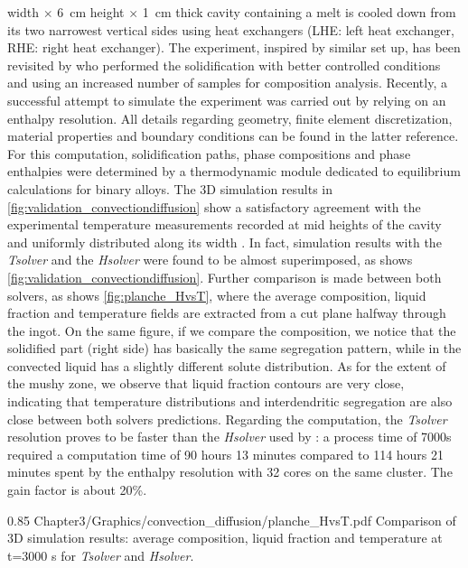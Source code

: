width $\times$ \SI{6}{\centi \metre} height $\times$ \SI{1}{\centi \metre} thick cavity containing 
a  melt is cooled down from its two 
narrowest vertical sides using heat exchangers (LHE: left heat exchanger, RHE: right heat exchanger). The 
experiment, inspired by \citet{hebditch_observations_1974} similar set up, has been 
revisited by \citet{hachani_experimental_2012} who performed the solidification with better 
controlled conditions and using an increased number of samples for composition analysis. Recently, a successful 
attempt to simulate the experiment was carried out by \citet{carozzani_direct_2013} relying on an enthalpy resolution. 
All details regarding geometry, finite element discretization, material properties 
and boundary conditions can be found in the latter reference. 
For this computation, solidification paths, phase compositions and phase enthalpies were determined by a thermodynamic 
module dedicated to equilibrium calculations for binary alloys. The 3D simulation results in \cref{fig:validation_convectiondiffusion}
show a satisfactory agreement with the experimental temperature measurements recorded at mid heights of the cavity and uniformly 
distributed along its width \citep{carozzani_direct_2013}. In fact, simulation results with the \emph{Tsolver} and the \emph{Hsolver} were 
found to be almost superimposed, as shows \cref{fig:validation_convectiondiffusion}. 
Further comparison is made between both solvers, as shows \cref{fig:planche_HvsT}, where the average
composition, liquid fraction and temperature fields are extracted from a cut plane halfway through the ingot. On the same figure,
if we compare the composition, we notice that the solidified part (right side) has basically the same segregation pattern, while
in the convected liquid has a slightly different solute distribution. As for the extent of the mushy zone, we observe that liquid
fraction contours are very close, indicating that temperature distributions and interdendritic segregation are also close between 
both solvers predictions.
Regarding the computation, the \emph{Tsolver} resolution proves to be 
faster than the \emph{Hsolver} used by \citet{carozzani_direct_2013}: a process time of 7000s required a computation time of 90 hours 
13 minutes compared to 114 hours 21 minutes spent by the enthalpy resolution with 32 cores on the same cluster. The gain factor 
is about 20\%.
%
\begin{figureth}
{0.85}
{Chapter3/Graphics/convection_diffusion/planche_HvsT.pdf}
{Comparison of 3D simulation results: average composition, liquid fraction and temperature at t=3000 s for \emph{Tsolver} and \emph{Hsolver}.}
\label{fig:planche_HvsT}
\end{figureth}
%

